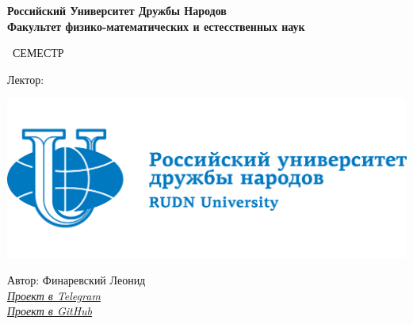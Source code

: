 \begin{titlepage}
	\clearpage\thispagestyle{empty}
	\centering
	
	\textbf{Российский Университет Дружбы Народов \\ Факультет физико-математических и естесственных наук}
	\vspace{33ex}
	
	{\Huge\textbf{\FullCourseNameFirstPart}}
	
	\SemesterNumber\ СЕМЕСТР  
	\vspace{1ex}
	
	Лектор: \textit{\LecturerInitials}
	
	\includegraphics[width=\textwidth]{images/logo.png}

	\begin{flushright}
		\noindent
		Автор: Финаревский Леонид
		\\
		\href{\TGLink}{\textit{Проект в Telegram}}
		\\
		\href{\GitLink}{\textit{Проект в GitHub}}
	\end{flushright}
	
	\vfill
	\CourseDate
	\pagebreak
\end{titlepage}